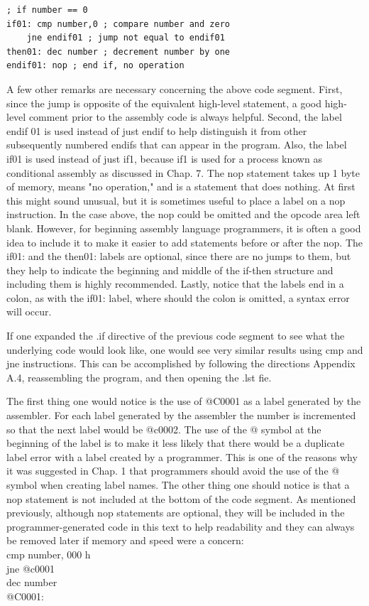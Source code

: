 \documentclass[10pt]{book}
\begin{document}
\begin{verbatim}
; if number == 0
if01: cmp number,0 ; compare number and zero
    jne endif01 ; jump not equal to endif01
then01: dec number ; decrement number by one
endif01: nop ; end if, no operation
\end{verbatim}

A few other remarks are necessary concerning the above code segment. First, since the jump is opposite of the equivalent high-level statement, a good high-level comment prior to the assembly code is always helpful. Second, the label endif 01 is used instead of just endif to help distinguish it from other subsequently numbered endifs that can appear in the program. Also, the label if01 is used instead of just if1, because if1 is used for a process known as conditional assembly as discussed in Chap. 7. The nop statement takes up 1 byte of memory, means "no operation," and is a statement that does nothing. At first this might sound unusual, but it is sometimes useful to place a label on a nop instruction. In the case above, the nop could be omitted and the opcode area left blank. However, for beginning assembly language programmers, it is often a good idea to include it to make it easier to add statements before or after the nop. The if01: and the then01: labels are optional, since there are no jumps to them, but they help to indicate the beginning and middle of the if-then structure and including them is highly recommended. Lastly, notice that the labels end in a colon, as with the if01: label, where should the colon is omitted, a syntax error will occur.

If one expanded the .if directive of the previous code segment to see what the underlying code would look like, one would see very similar results using cmp and jne instructions. This can be accomplished by following the directions Appendix A.4, reassembling the program, and then opening the .lst fie.

The first thing one would notice is the use of @C0001 as a label generated by the assembler. For each label generated by the assembler the number is incremented so that the next label would be @c0002. The use of the @ symbol at the beginning of the label is to make it less likely that there would be a duplicate label error with a label created by a programmer. This is one of the reasons why it was suggested in Chap. 1 that programmers should avoid the use of the @ symbol when creating label names. The other thing one should notice is that a nop statement is not included at the bottom of the code segment. As mentioned previously, although nop statements are optional, they will be included in the programmer-generated code in this text to help readability and they can always be removed later if memory and speed were a concern:\\
cmp number, 000 h\\
jne @c0001\\
dec number\\
@C0001:
\end{document}
